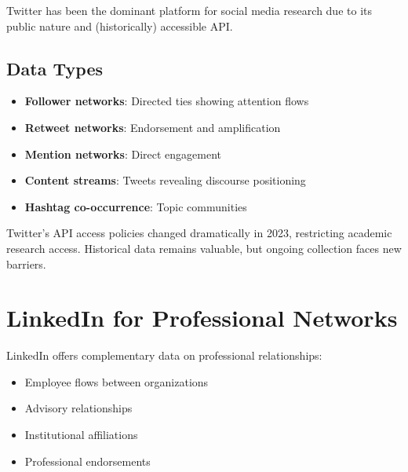 Twitter has been the dominant platform for social media research due to its public nature and (historically) accessible API.

\subsection*{Data Types}

\begin{itemize}[leftmargin=*, itemsep=0.2em]
\item \textbf{Follower networks}: Directed ties showing attention flows
\item \textbf{Retweet networks}: Endorsement and amplification
\item \textbf{Mention networks}: Direct engagement
\item \textbf{Content streams}: Tweets revealing discourse positioning
\item \textbf{Hashtag co-occurrence}: Topic communities
\end{itemize}

\begin{criticalbox}
Twitter's API access policies changed dramatically in 2023, restricting academic research access. Historical data remains valuable, but ongoing collection faces new barriers.
\end{criticalbox}


\section*{LinkedIn for Professional Networks}

LinkedIn offers complementary data on professional relationships:

\begin{itemize}[leftmargin=*, itemsep=0.2em]
\item Employee flows between organizations
\item Advisory relationships
\item Institutional affiliations
\item Professional endorsements
\end{itemize}



